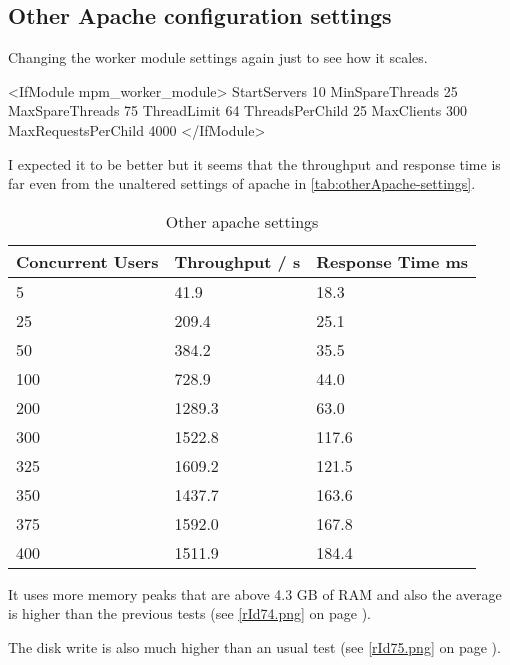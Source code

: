 \clearpage{}

\subsection{Other Apache configuration settings}\label{subsec:apacheOtherSettings}
Changing the worker module settings again just to see how it scales.
\begin{codelisting}
<IfModule mpm_worker_module>
    StartServers          10
    MinSpareThreads      25
    MaxSpareThreads      75 
    ThreadLimit          64
    ThreadsPerChild      25
    MaxClients          300
    MaxRequestsPerChild   4000
</IfModule>
\end{codelisting}
I expected it to be better but it seems that the throughput and response time is far even from the unaltered settings of \gls{apache} in \autoref{tab:otherApache-settings}.

\begin{table}[ht!]\begin{center}
\caption{Other apache settings}\label{tab:otherApache-settings}
\begin{tabular}{|p{2.2cm}|p{2.3cm}|p{2.3cm}|}\hline\rowcolor{myLightGreen}\arrayrulecolor{myLightGreen}
 {\bf\color{white} Concurrent Users} & {\bf\color{white} Throughput / s} & {\bf\color{white} Response Time ms} \\ \hline 
 5 & 41.9 & 18.3 \\ \hline 
 25 & 209.4 & 25.1 \\ \hline 
 50 & 384.2 & 35.5 \\ \hline 
 100 & 728.9 & 44.0 \\ \hline 
 200 & 1289.3 & 63.0 \\ \hline 
 300 & 1522.8 & 117.6 \\ \hline 
 325 & 1609.2 & 121.5 \\ \hline 
 350 & 1437.7 & 163.6 \\ \hline 
 375 & 1592.0 & 167.8 \\ \hline 
 400 & 1511.9 & 184.4 \\ \hline 
\end{tabular}\end{center}
\end{table}
It uses more memory peaks that are above 4.3 GB of RAM and also the average is higher than the previous tests (see \autoref{rId74.png} on page \pageref{rId74.png}).

The disk write is also much higher than an usual test (see \autoref{rId75.png} on page \pageref{rId75.png}).

